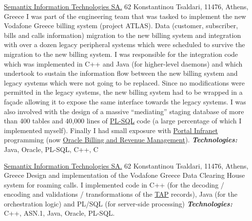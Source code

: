 \documentclass[helvetica,english,logo,notitle,totpages,utf8]{europecv2013}
\newcommand{\technologies}[0]{\textbf{\textit{Technologies:}}}
\begin{document}
\begin{europecv}
                   {\href{http://www.semantix.gr}{Semantix Information Technologies SA.}}
                   {62 Konstantinou Tsaldari, 11476, Athens, Greece}
                   {
    I was part of the engineering team that was tasked to implement the new Vodafone Greece billing system (project ATLAS).
    Data (customer, subscriber, bills and
    calls information) migration to the new billing system and integration with over a dozen legacy
    peripheral systems which were scheduled to survive the migration to the new billing system.
    I was responsible for the integration code which was implemented in
    C++ and Java (for higher-level daemons) and which undertook to sustain the information flow between the
    new billing system and legacy systems which were not going to be replaced. Since no modifications were
    permitted in the legacy systems, the new billing system had to be wrapped in a fa\c{c}ade allowing it to
    expose the same interface towards the legacy systems.
    I was also involved with the design of a massive ``mediating'' staging database of more
    than 400 tables and 40,000 lines of \href{https://en.wikipedia.org/wiki/PL/SQL}{PL-SQL} code
    (a large percentage of which I implemented myself).
    Finally I had small exposure with \href{https://en.wikipedia.org/wiki/Portal_Software}{Portal Infranet} programming
    (now \href{http://www.orafaq.com/wiki/BRM}{Oracle Billing and Revenue Management}).
    \technologies{} Java, Oracle, PL-SQL, C++, C
                   }                   

                   {\href{http://www.semantix.gr}{Semantix Information Technologies SA.}}
                   {62 Konstantinou Tsaldari, 11476, Athens, Greece}
                   {
    Design and implementation of the Vodafone Greece Data Clearing House system for roaming calls.
    I implemented code in C++ (for the decoding / encoding and validations / transformations
    of the \href{http://what-when-how.com/roaming-in-wireless-networks/transferred-account-procedures-billing-and-settlement/}{TAP} records), Java (for the orchestration logic) and PL/SQL (for server-side processing)
    \technologies{} C++, ASN.1, Java, Oracle, PL-SQL.
                   }                   
                   
%
%
%
%
%
%
%



\end{europecv}
\end{document}
